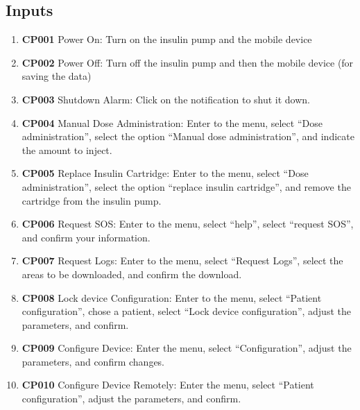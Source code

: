 \documentclass{scrreprt}
\begin{document}
\subsection{Inputs}
\begin{enumerate}
    \item \textbf{CP001} Power On: Turn on the insulin pump and the mobile device
    \item \textbf{CP002} Power Off: Turn off the insulin pump and then the mobile device (for saving the data)
    \item \textbf{CP003} Shutdown Alarm: Click on the notification to shut it down.
    \item \textbf{CP004} Manual Dose Administration: Enter to the menu, select “Dose administration”, select the option “Manual dose administration”, and indicate the amount to inject. 
    \item \textbf{CP005} Replace Insulin Cartridge: Enter to the menu, select “Dose administration”, select the option “replace insulin cartridge”, and remove the cartridge from the insulin pump.
    \item \textbf{CP006} Request SOS: Enter to the menu, select “help”, select “request SOS”, and confirm your information.
    \item \textbf{CP007} Request Logs: Enter to the menu, select “Request Logs”, select the areas to be downloaded, and confirm the download. 
    \item \textbf{CP008} Lock device Configuration: Enter to the menu, select “Patient configuration”, chose a patient, select “Lock device configuration”, adjust the parameters, and confirm.
    \item \textbf{CP009} Configure Device: Enter the menu, select “Configuration”, adjust the parameters, and confirm changes.
    \item \textbf{CP010} Configure Device Remotely: Enter the menu, select “Patient configuration”, adjust the parameters, and confirm.
\end{enumerate}
\end{document}
